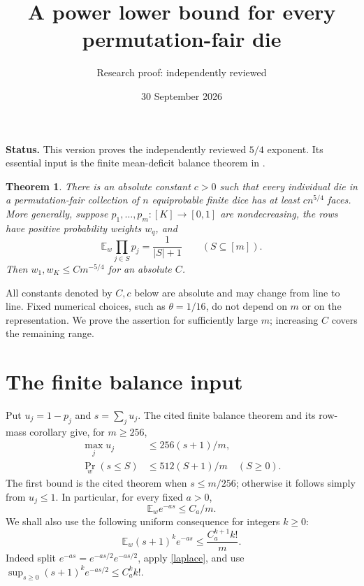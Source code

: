 \documentclass[11pt]{article}
\title{A power lower bound for every permutation-fair die}
\author{Research proof: independently reviewed}
\date{30 September 2026}
\newtheorem{theorem}{Theorem}
\newcommand{\E}{\mathbb E}
\begin{document}
\maketitle
\noindent\textbf{Status.} This version proves the independently reviewed $5/4$ exponent.
Its essential input is the finite mean-deficit balance
theorem in
.

\begin{theorem}\label{main}
There is an absolute constant $c>0$ such that every individual die in
a permutation-fair collection of $n$ equiprobable finite dice has at
least $c n^{5/4}$ faces.
More generally, suppose $p_1,\ldots,p_m:[K]\to[0,1]$ are nondecreasing,
the rows have positive probability weights $w_q$, and
\[
 \E_w\prod_{j\in S}p_j=\frac1{|S|+1}\qquad(S\subseteq[m]).
\]
Then $w_1,w_K\le C m^{-5/4}$ for an absolute $C$.
\end{theorem}

All constants denoted by $C,c$ below are absolute and may change from
line to line. Fixed numerical choices, such as $\theta=1/16$, do not
depend on $m$ or on the representation. We prove the assertion for
sufficiently large $m$; increasing $C$ covers the remaining range.

\section*{The finite balance input}
Put $u_j=1-p_j$ and $s=\sum_j u_j$. The cited finite balance theorem
and its row-mass corollary give, for $m\ge256$,
\begin{align}
 \max_j u_j&\le256(s+1)/m,                    \label{balance}\\
 \Pr_w(s\le S)&\le512(S+1)/m\quad(S\ge0).          \label{mass}
\end{align}
The first bound is the cited theorem when $s\le m/256$; otherwise
it follows simply from $u_j\le1$. In particular, for every fixed $a>0$,
\begin{equation}\label{laplace}
 \E_w e^{-as}\le C_a/m.
\end{equation}
We shall also use the following uniform consequence for integers $k\ge0$:
\begin{equation}\label{weightedmoments}
 \E_w (s+1)^k e^{-as}\le \frac{C_a^{k+1}k!}{m}.
\end{equation}
Indeed split $e^{-as}=e^{-as/2}e^{-as/2}$, apply \eqref{laplace}, and
use $\sup_{s\ge0}(s+1)^k e^{-as/2}\le C_a^k k!$.
\end{document}
